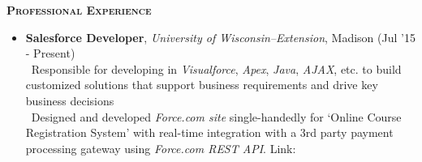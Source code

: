 \documentclass[11pt]{article}
\begin{document}
\begin{mdframed}[backgroundcolor=light-gray, linecolor=light-gray, roundcorner=10pt, shadow=false, shadowsize=1pt]
\Large{\textbf{\textsc{Professional Experience}}}
\end{mdframed}
\begin{itemize}\addtolength{\itemsep}{-0.5\baselineskip}%
\item {\textbf{Salesforce Developer}, \textit{University of 
Wisconsin--Extension}, Madison \hfill (Jul '15 - Present)}\\
		\noindent \textendash\ Responsible for developing in \textit{Visualforce}, \textit{Apex}, \textit{Java}, \textit{AJAX}, 
		etc. to build customized solutions that support business requirements and drive key business decisions\\
		\noindent \textendash\ Designed and developed \textit{Force.com site} single-handedly for `Online Course Registration System' with
		real-time integration with a 3rd party payment processing gateway using \textit{Force.com REST API}. Link: 

\end{itemize}
\end{document}
